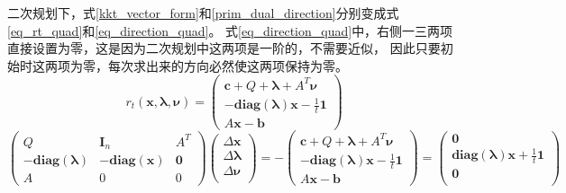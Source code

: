 \documentclass{article}
\begin{document}
二次规划下，式\eqref{kkt_vector_form}和\eqref{prim_dual_direction}分别变成式\eqref{eq_rt_quad}和\eqref{eq_direction_quad}。
式\eqref{eq_direction_quad}中，右侧一三两项直接设置为零，这是因为二次规划中这两项是一阶的，不需要近似，
因此只要初始时这两项为零，每次求出来的方向必然使这两项保持为零。
\newcommand{\bx}{\bm x}
\newcommand{\bl}{\bm \lambda}
\newcommand{\bn}{\bm \nu}
\newcommand{\bQ}{Q}
\newcommand{\bA}{A}
\newcommand{\AT}{A^T}
\newcommand{\bc}{\bm c}
\newcommand{\bb}{\bm b}
\newcommand{\diaglambda}{\textbf{diag}(\bm\lambda)}
\newcommand{\diagx}{\textbf{diag}(\bm x)}
\newcommand{\be}{\bm 1}
\newcommand{\dx}{\Delta\bm x}
\newcommand{\dl}{\Delta\bm \lambda}
\newcommand{\dn}{\Delta\bm \nu}
\begin{equation}
    \label{eq_rt_quad}
    r_t(\bx,\bl,\bn)=\begin{pmatrix}
        \bc+\bQ+\bl+\AT\bn\\
        -\diaglambda\bx-\frac{1}{t}\be\\
        \bA\bx-\bb
    \end{pmatrix}
\end{equation}
\begin{equation}
    \label{eq_direction_quad}
    \begin{pmatrix}
        \bQ &\bm I_n & \AT\\
        -\diaglambda& -\diagx & \bm 0 \\
        \bA & 0 & 0
    \end{pmatrix}
    \begin{pmatrix}
        \dx\\
        \dl\\
        \dn\\
    \end{pmatrix}=
    -\begin{pmatrix}
        \bc+\bQ+\bl+\AT\bn\\
        -\diaglambda\bx-\frac{1}{t}\be\\
        \bA\bx-\bb
    \end{pmatrix}=
    \begin{pmatrix}
        \bm 0\\
        \diaglambda\bx+\frac{1}{t}\be\\
        \bm 0\\
    \end{pmatrix}
\end{equation}
\end{document}
